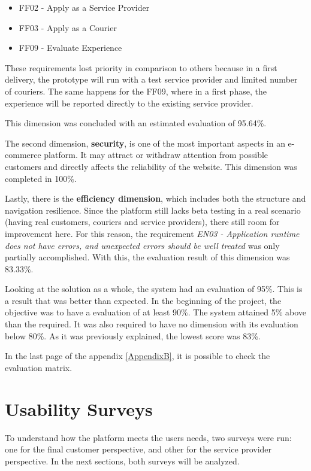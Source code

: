 \begin{itemize}
    \item FF02 - Apply as a Service Provider
    \item FF03 - Apply as a Courier
    \item FF09 - Evaluate Experience
\end{itemize}

These requirements lost priority in comparison to others because in a first delivery, the prototype will run with a test service provider and limited number of couriers. The same happens for the FF09, where in a first phase, the experience will be reported directly to the existing service provider.
\par
This dimension was concluded with an estimated evaluation of 95.64\%.

\par

The second dimension, \textbf{security}, is one of the most important aspects in an e-commerce platform. It may attract or withdraw attention from possible customers and directly affects the reliability of the website. This dimension was completed in 100\%.

\par

Lastly, there is the \textbf{efficiency dimension}, which includes both the structure and navigation resilience. Since the platform still lacks beta testing in a real scenario (having real customers, couriers and service providers), there still room for improvement here. For this reason, the requirement \textit{EN03 - Application runtime does not have errors, and unexpected errors should be well treated} was only partially accomplished. With this, the evaluation result of this dimension was 83.33\%.

\par

Looking at the solution as a whole, the system had an evaluation of 95\%. This is a result that was better than expected. In the beginning of the project, the objective was to have a evaluation of at least 90\%. The system attained 5\% above than the required. It was also required to have no dimension with its evaluation below 80\%. As it was previously explained, the lowest score was 83\%.
\par
In the last page of the appendix \ref{AppendixB}, it is possible to check the evaluation matrix.

\section{Usability Surveys}
To understand how the platform meets the users needs, two surveys were run: one for the final customer perspective, and other for the service provider perspective. In the next sections, both surveys will be analyzed. 

